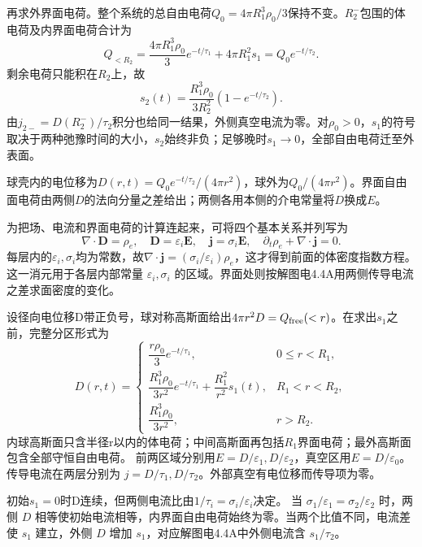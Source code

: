 \documentclass[UTF8,fontset=fandol,a4paper,11pt]{ctexart}
\begin{document}
再求外界面电荷。整个系统的总自由电荷$Q_0=4\pi R_1^3\rho_0/3$保持不变。$R_2^-$包围的体电荷及内界面电荷合计为
\[
Q_{<R_2}=\frac{4\pi R_1^3\rho_0}{3}e^{-t/\tau_1}+4\pi R_1^2s_1
=Q_0e^{-t/\tau_2}.
\]
剩余电荷只能积在$R_2$上，故
\[
\boxed{s_2(t)=\frac{R_1^3\rho_0}{3R_2^2}(1-e^{-t/\tau_2})}.
\]
由$j_{2-}=D(R_2^-)/\tau_2$积分也给同一结果，外侧真空电流为零。对$\rho_0>0$，$s_1$的符号取决于两种弛豫时间的大小，$s_2$始终非负；足够晚时$s_1\to0$，全部自由电荷迁至外表面。

球壳内的电位移为$D(r,t)=Q_0e^{-t/\tau_2}/(4\pi r^2)$，球外为$Q_0/(4\pi r^2)$。界面自由面电荷由两侧$D$的法向分量之差给出；两侧各用本侧的介电常量将$D$换成$E$。


为把场、电流和界面电荷的计算连起来，可将四个基本关系并列写为
\[
\nabla\cdot\boldsymbol D=\rho_e,\quad \boldsymbol D=\varepsilon_i\boldsymbol E,\quad
\boldsymbol j=\sigma_i\boldsymbol E,\quad \partial_t\rho_e+\nabla\cdot\boldsymbol j=0.
\]
每层内的$\varepsilon_i,\sigma_i$均为常数，故$\nabla\cdot\boldsymbol j=(\sigma_i/\varepsilon_i)\rho_e$，这才得到前面的体密度指数方程。
这一消元用于各层内部常量 $\varepsilon_i,\sigma_i$ 的区域。界面处则按解图电4.4A用两侧传导电流之差求面密度的变化。

设径向电位移D带正负号，球对称高斯面给出$4\pi r^2D=Q_{\rm free}(<r)$。在求出$s_1$之前，完整分区形式为
\[
D(r,t)=\begin{cases}
\dfrac{r\rho_0}{3}e^{-t/\tau_1},&0\le r<R_1,\\[4pt]
\dfrac{R_1^3\rho_0}{3r^2}e^{-t/\tau_1}+\dfrac{R_1^2}{r^2}s_1(t),&R_1<r<R_2,\\[4pt]
\dfrac{R_1^3\rho_0}{3r^2},&r>R_2.
\end{cases}
\]
内球高斯面只含半径r以内的体电荷；中间高斯面再包括$R_1$界面电荷；最外高斯面包含全部守恒自由电荷。
前两区域分别用$E=D/\varepsilon_1,D/\varepsilon_2$，真空区用$E=D/\varepsilon_0$。传导电流在两层分别为 $j=D/\tau_1,D/\tau_2$。外部真空有电位移而传导项为零。

初始$s_1=0$时D连续，但两侧电流比由$1/\tau_i=\sigma_i/\varepsilon_i$决定。
当 $\sigma_1/\varepsilon_1=\sigma_2/\varepsilon_2$ 时，两侧 $D$ 相等使初始电流相等，内界面自由电荷始终为零。当两个比值不同，电流差使 $s_1$ 建立，外侧 $D$ 增加 $s_1$，对应解图电4.4A中外侧电流含 $s_1/\tau_2$。
\end{document}
